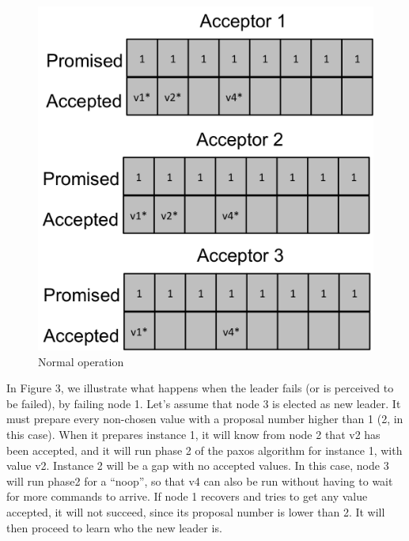 \documentclass[letterpaper]{article}
\begin{document}
\begin{figure}[h!]
\centering
\includegraphics[scale=.5]{figure2.png}
\caption{Normal operation}
\end{figure}

\pagebreak

In Figure 3, we illustrate what happens when the leader fails (or is perceived
to be failed), by failing node 1. Let's assume that node 3 is elected as new
leader. It must prepare every non-chosen value with a proposal number higher
than 1 (2, in this case). When it prepares instance 1, it will know from node 2
that v2 has been accepted, and it will run phase 2 of the paxos algorithm for
instance 1, with value v2. Instance 2 will be a gap with no accepted values. In
this case, node 3 will run phase2 for a ``noop'', so that v4 can also be run
without having to wait for more commands to arrive. If node 1 recovers and tries
to get any value accepted, it will not succeed, since its proposal number is
lower than 2. It will then proceed to learn who the new leader is.
\end{document}
